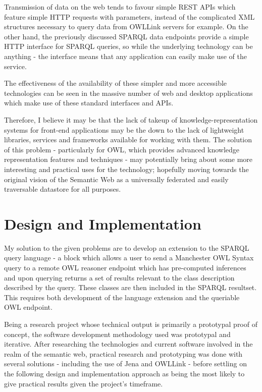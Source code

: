 \documentclass{article}
\begin{document}
Transmission of data on the web tends to favour simple REST APIs which feature 
simple HTTP requests with parameters, instead of the complicated XML structures 
necessary to query data from OWLLink servers for example. On the other hand, the
previously discussed SPARQL data endpoints provide a simple HTTP interface for
SPARQL queries, so while the underlying technology can be anything - the
interface means that any application can easily make use of the service.

The effectiveness of the availability of these simpler and more accessible 
technologies can be seen in the massive number of web and desktop applications
which make use of these standard interfaces and APIs.

Therefore, I believe it may be that the lack of takeup of knowledge-representation systems
for front-end applications may be the down to the lack of lightweight libraries, 
services and frameworks available for working with them. The solution of this
problem - particularly for OWL, which provides advanced knowledge representation
features and techniques - may potentially bring about some more interesting and
practical uses for the technology; hopefully moving towards the original vision
of the Semantic Web as a universally federated and easily traversable datastore
for all purposes.

\section{Design and Implementation}

My solution to the given problems are to develop an extension to the SPARQL
query language - a block which allows a user to send a Manchester OWL Syntax query to a
remote OWL reasoner endpoint which has pre-computed inferences and upon querying
returns a set of results relevant to the class description described by the
query. These classes are then included in the SPARQL resultset. This requires 
both development of the language extension and the queriable OWL endpoint.

Being a research project whose technical output is primarily a prototypal proof
of concept, the software development methodology used was prototypal and
iterative. After researching the technologies and current software involved in
the realm of the semantic web, practical research and prototyping was done with 
several solutions - including the use of Jena and OWLLink - before settling on
the following design and implementation approach as being the most likely to
give practical results given the project's timeframe.
\end{document}
